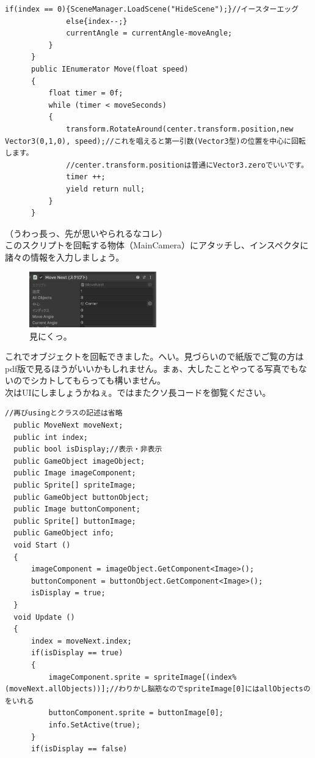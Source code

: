 \documentclass[b5paper,9pt,platex,dvipdfmx]{jsarticle}
\begin{document}
\begin{multicols*}{3}
\begin{lstlisting}[caption=MoveNext.cs]
              if(index == 0){SceneManager.LoadScene("HideScene");}//イースターエッグ
              else{index--;}
              currentAngle = currentAngle-moveAngle;
          }
      }
      public IEnumerator Move(float speed)
      {
          float timer = 0f;
          while (timer < moveSeconds)
          {
              transform.RotateAround(center.transform.position,new Vector3(0,1,0), speed);//これを唱えると第一引数(Vector3型)の位置を中心に回転します。
              //center.transform.positionは普通にVector3.zeroでいいです。
              timer ++;
              yield return null;
          }
      }
\end{lstlisting}
（うわっ長っ、先が思いやられるなコレ）\\
このスクリプトを回転する物体（MainCamera）にアタッチし、インスペクタに諸々の情報を入力しましょう。\\
\begin{figure}[H]
  \centering
  \includegraphics[width=5.5cm]{4.png}
  \caption{見にくっ。}
\end{figure}
これでオブジェクトを回転できました。へい。見づらいので紙版でご覧の方はpdf版で見るほうがいいかもしれません。まぁ、大したことやってる写真でもないのでシカトしてもらっても構いません。\\
次はUIにしましょうかねぇ。ではまたクソ長コードを御覧ください。\\
\begin{lstlisting}[caption=UIDraw.cs]
  //再びusingとクラスの記述は省略
  public MoveNext moveNext;
  public int index;
  public bool isDisplay;//表示・非表示
  public GameObject imageObject;
  public Image imageComponent;
  public Sprite[] spriteImage;
  public GameObject buttonObject;
  public Image buttonComponent;
  public Sprite[] buttonImage;
  public GameObject info;
  void Start ()
  {
      imageComponent = imageObject.GetComponent<Image>();
      buttonComponent = buttonObject.GetComponent<Image>();
      isDisplay = true;
  }
  void Update ()
  {
      index = moveNext.index;
      if(isDisplay == true)
      {
          imageComponent.sprite = spriteImage[(index%(moveNext.allObjects))];//わりかし脳筋なのでspriteImage[0]にはallObjectsのをいれる
          buttonComponent.sprite = buttonImage[0];
          info.SetActive(true);
      }
      if(isDisplay == false)

\end{lstlisting}
\end{multicols*}
\end{document}
